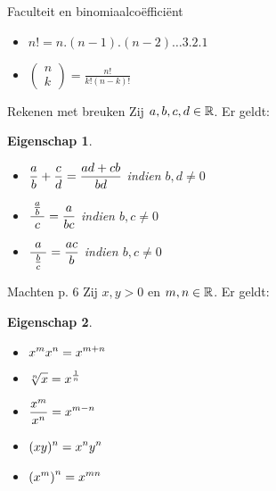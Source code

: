 \documentclass{beamer}
\theoremstyle{eigenschap}
\newtheorem{proposition}{Eigenschap}
\begin{document}
\begin{frame}{Faculteit en binomiaalco\"effici\"ent}
\begin{definition}
\begin{itemize}
	\item[] $n! = n.(n-1).(n-2) \ldots  3.2.1$
	\item[] $\displaystyle \left( \begin{array}{c} n \\ k \end{array} \right) = \frac{n!}{k! (n-k)!}$
\end{itemize}
\end{definition}
\end{frame}

\begin{frame}{Rekenen met breuken}
Zij $a,b,c,d\in \mathbb{R}$. Er geldt:
\begin{proposition}
\begin{itemize}
	\item $\displaystyle{\frac{a}{b}+\frac{c}{d}}=\displaystyle{\frac{ad+cb}{bd}}$ \hspace{3mm}   indien $b,d \neq 0$
	\item $\ds{\frac{\frac{a}{b}}{\ c\ }}=\ds{\frac{a}{bc}}$ \hspace{3mm}   indien $b,c \neq 0$
	\item $\ds{\frac{a}{\ \frac{b}{c}\ }}=\ds{\frac{ac}{b}}$ \hspace{3mm}   indien $b,c \neq 0$
\end{itemize}
\end{proposition}
\end{frame}

\begin{frame}{Machten p. 6}
Zij $x,y>0$ en $m,n\in\mathbb{R}$. Er geldt:

\begin{proposition}
\begin{itemize}
	\item $\displaystyle{x^{m}x^{n}}= \displaystyle{x^{m+n}}$
	\item $\displaystyle{\sqrt[n] x = x^{\frac1n}}$
	\item $\displaystyle{\frac{x^{m}}{x^{n}}}= \displaystyle{x^{m-n}}$
	\item $\displaystyle{(xy)^n}=\displaystyle{x^ny^n}$
	\item $\displaystyle{\left(x^{m}\right)^{n}}= \displaystyle{x^{mn}}$
\end{itemize}
\end{proposition}
\end{frame}
\end{document}
